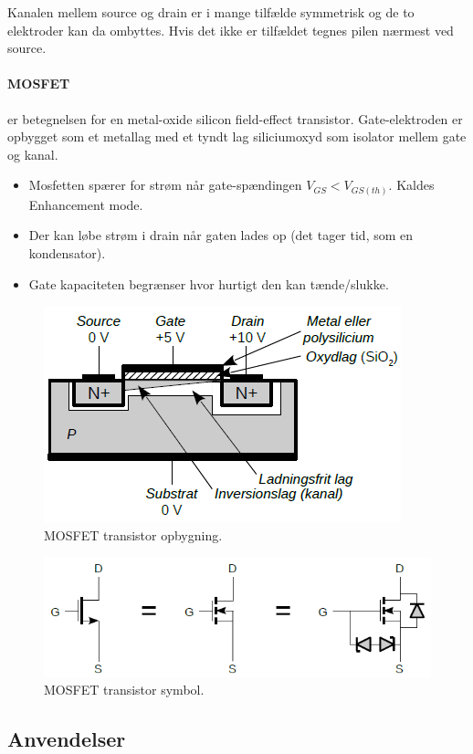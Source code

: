 \documentclass[danish]{article}
\begin{document}
Kanalen mellem source og drain er i mange tilfælde symmetrisk og de to elektroder kan da ombyttes. Hvis det ikke er tilfældet tegnes pilen nærmest ved source.


\paragraph{MOSFET} er betegnelsen for en metal-oxide silicon field-effect transistor. 
Gate-elektroden er opbygget som et metallag med et tyndt lag siliciumoxyd som isolator mellem gate og kanal.

\begin{itemize}
	\item Mosfetten spærer for strøm når gate-spændingen $V_{GS} < V_{GS (th)}$. Kaldes Enhancement mode.
	\item Der kan løbe strøm i drain når gaten lades op (det tager tid, som en kondensator).
	\item Gate kapaciteten begrænser hvor hurtigt den kan tænde/slukke.
\end{itemize}

\begin{figure} [H]
	\centering
	\includegraphics[width=0.5\linewidth]{graphics/mosfet}
	\caption{MOSFET transistor opbygning.}
	\label{fig:mosfet}
\end{figure}

\begin{figure} [H]
	\centering
	\includegraphics[width=0.8\linewidth]{graphics/mosfet_symbol}
	\caption{MOSFET transistor symbol.}
	\label{fig:mosfet_symbol}
\end{figure}

\newpage
\subsection{Anvendelser}
\end{document}
